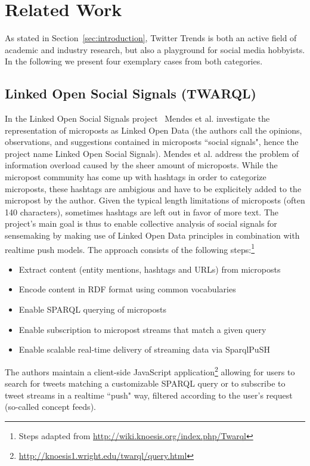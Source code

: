 \documentclass[runningheads,a4paper]{llncs}
\begin{document}
\section{Related Work}\label{sec:relatedwork}
As stated in Section~\ref{sec:introduction}, Twitter Trends is both an active field of academic and industry research, but also a playground for social media hobbyists. In the following we present four exemplary cases from both categories.

\subsection{Linked Open Social Signals (TWARQL)}
In the Linked Open Social Signals project~\cite{Mendes:LOSS} Mendes et al. investigate the representation of microposts as Linked Open Data (the authors call the opinions, observations, and suggestions contained in microposts ``social signals", hence the project name Linked Open Social Signals). Mendes et al. address the problem of information overload caused by the sheer amount of microposts. While the micropost community has come up with hashtags in order to categorize microposts, these hashtags are ambigious and have to be explicitely added to the micropost by the author. Given the typical length limitations of microposts (often 140 characters), sometimes hashtags are left out in favor of more text. The project's main goal is thus to enable collective analysis of social signals for sensemaking by making use of Linked Open Data principles in combination with realtime push models. The approach consists of the following steps:\footnote{Steps adapted from \url{http://wiki.knoesis.org/index.php/Twarql}} 
\begin{itemize}
\item Extract content (entity mentions, hashtags and URLs) from microposts
\item Encode content in RDF format using common vocabularies
\item Enable SPARQL querying of microposts
\item Enable subscription to micropost streams that match a given query
\item Enable scalable real-time delivery of streaming data via SparqlPuSH
\end{itemize}
The authors maintain a client-side JavaScript application\footnote{\url{http://knoesis1.wright.edu/twarql/query.html}} allowing for users to search for tweets matching a customizable SPARQL query or to subscribe to tweet streams in a realtime ``push" way, filtered according to the user's request (so-called concept feeds).
\end{document}
